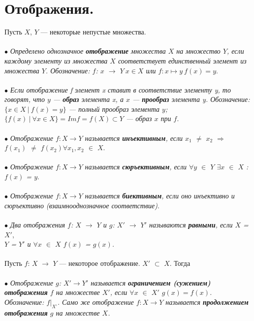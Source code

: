 \documentclass[a4paper, 12pt]{report}
\begin{document}
		\section{Отображения.}
	Пусть $X$, $Y$ --- некоторые непустые множества.\\\\
	$\bullet$ \textit{Определено однозначное \textbf{отображение} множества $X$ на множество $Y$, если каждому элементу из множества $X$ соответствует единственный элемент из множества $Y$. Обозначение: $f$: $x$ $\rightarrow$ $Y\ x\in X$ или $f:x\mapsto y\ f(x) = y$}.\\\\
	$\bullet$ \textit{Если отображение f элемент x ставит в соответствие элементу y, то говорят, что $y$ --- \textbf{образ} элемента x, а $x$ --- \textbf{прообраз} элемента y. Обозначение: $\{x\in X\ |\ f(x) = y\}$ --- полный прообраз элемента $y$;  $\{f(x)\ |\ \forall x\in X \} = Imf = f(X)\subset Y$ --- образ $x$ при $f$}. \\\\
	$\bullet$ \textit{Отображение $f: X\rightarrow Y$ называется \textbf{инъективным}, если $x_1$ $\not=$ $x_2$ $\Rightarrow$ \\ $f(x_1)$ $\not=$ $f(x_2)$\quad $\forall x_1, x_2$ $\in$ $X$}.\\\\
	$\bullet$ \textit{Отображение $f: X\rightarrow Y$ называется \textbf{сюръективным}, если $\forall$$y$ $\in$ $Y$  $\exists$$x$ $\in$ $X$ : $f(x)$ = $y$}.\\\\
	$\bullet$ \textit{Отображение $f: X\rightarrow Y$ называется \textbf{биективным}, если оно инъективно и сюръективно} \textit{(взаимнооднозначное соответствие)}.\\\\
	$\bullet$ \textit{Два отображения $f$: $X$ $\rightarrow$ $Y$ и $g$: $X'$ $\rightarrow$ $Y'$ называются \textbf{равными}, если $X$ = $X'$}, \\ \textit{$Y$ = $Y'$ и $\forall x$ $\in$ $X$ $f(x)$ = $g(x)$.}\\\\
	Пусть $f$: $X$ $\rightarrow$ $Y$ --- некоторое отображение. $X'$ $\subset$ $X$. Тогда \\\\
	$\bullet$ \textit{Отображение $g$: $X' \rightarrow Y'$ называется \textbf{ограничением (сужением) отображения} $f$ на множестве $X'$, если $\forall x$ $\in$ $X'$ $g(x) = f(x)$. Обозначение: $f|_\textit{X'}$. Само же отображение $f:X\rightarrow Y$ называется \textbf{продолжением отображения} $g$ на множестве $X$.}\\\\
\end{document}
